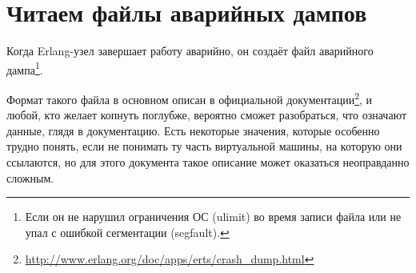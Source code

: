 \documentclass[11pt, oneside]{book}   	%
\begin{document}


\chapter{Читаем файлы аварийных дампов}
\label{chap:crash-dumps}

Когда Erlang-узел завершает работу аварийно, он создаёт файл аварийного дампа\footnote{Если он не нарушил ограничения ОС (ulimit) во время записи файла или не упал с ошибкой сегментации (segfault).}.

Формат такого файла в основном описан в официальной документации\footnote{\href{http://www.erlang.org/doc/apps/erts/crash\_dump.html}{http://www.erlang.org/doc/apps/erts/crash\_dump.html}}, и любой, кто желает копнуть поглубже, вероятно сможет разобраться, что означают данные, глядя в документацию. Есть некоторые значения, которые особенно трудно понять, если не понимать ту часть виртуальной машины, на которую они ссылаются, но для этого документа такое описание может оказаться неоправданно сложным. 
\end{document}
